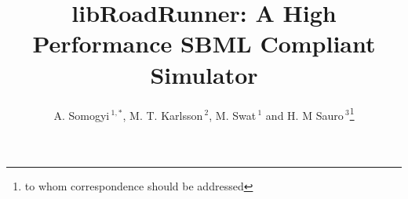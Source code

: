 \documentclass{bioinfo}
\begin{document}

\title[libRoadRunner]{libRoadRunner: A High Performance SBML Compliant Simulator}
\author[Sample \textit{et~al}]{A. Somogyi\,$^{1,*}$, M. T. Karlsson\,$^{2}$, M. Swat\,$^{1}$ and H. M Sauro\,$^3$\footnote{to whom correspondence should be addressed}}
\address{$^{1,3}$Biocomplexity Institute, Indiana University, Simon Hall MSB1, 043D, 212 S. Hawthorne Drive, Bloomington, IN  47405-7003
\\
$^{2}$Dune Scientific, 10522 Lake City Way NE, \#302 Seattle WA \\
$^{3}$Department of Bioengineering, University of Washington, Seattle, WA, 98195}



\maketitle
\end{document}
